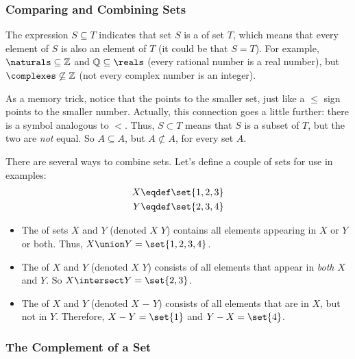 \subsubsection{Comparing and Combining Sets}

The expression $S \subseteq T$ indicates that set $S$ is a 
of set $T$, which means that every element of $S$ is also an element of
$T$ (it could be that $S=T$).  For example, $\naturals \subseteq
\mathbb{Z}$ and $\mathbb{Q} \subseteq
\reals$ (every rational number is a real number), but $\complexes
\not\subseteq \mathbb{Z}$ (not every complex number is an integer).

As a memory trick, notice that the \term{$\subseteq$} points to the
smaller set, just like a $\leq$ sign points to the smaller number.
Actually, this connection goes a little further: there is a symbol
\term{$\subset$} analogous to $<$.  Thus, $S \subset T$ means that $S$
is a subset of $T$, but the two are \emph{not} equal.  So $A \subseteq
A$, but $A \not\subset A$, for every set $A$.

There are several ways to combine sets.  Let's define a couple of sets for
use in examples:
\begin{align*}
X & \eqdef \set{1, 2, 3} \\
Y & \eqdef \set{2, 3, 4}
\end{align*}

\begin{itemize}

\item The  of sets $X$ and $Y$ (denoted $X$ \term{$\union$} $Y$)
contains all elements appearing in $X$ or $Y$ or both.  Thus, $X \union
Y = \set{1, 2, 3, 4}$.

\item The  of $X$ and $Y$ (denoted $X$
  \term{$\intersect$} $Y$) consists of all elements that appear in
  \emph{both} $X$ and $Y$.  So $X \intersect Y = \set{2, 3}$.

\item The  of $X$ and $Y$ (denoted $X$ $-$ $Y$) consists of all elements that are in $X$, but not in $Y$.
  Therefore, $X - Y = \set{1}$ and $Y - X = \set{4}$.

\end{itemize}

\subsubsection{The Complement of a Set}

